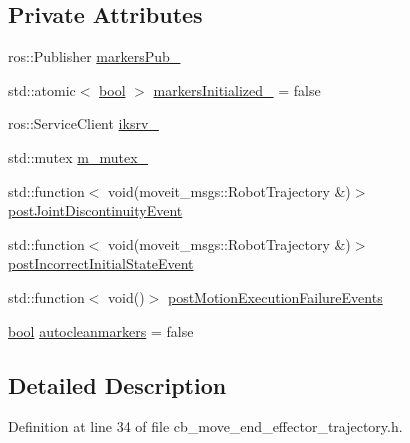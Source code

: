 \subsection*{Private Attributes}
\begin{DoxyCompactItemize}
\item 
ros\+::\+Publisher \hyperlink{classcl__move__group__interface_1_1CbMoveEndEffectorTrajectory_aabc2216b2d8625fecd83c5ec69928e63}{markers\+Pub\+\_\+}
\item 
std\+::atomic$<$ \hyperlink{classbool}{bool} $>$ \hyperlink{classcl__move__group__interface_1_1CbMoveEndEffectorTrajectory_ac140a7f0adfb20f1e2900a5c8cd2ca5b}{markers\+Initialized\+\_\+} = false
\item 
ros\+::\+Service\+Client \hyperlink{classcl__move__group__interface_1_1CbMoveEndEffectorTrajectory_a8a2e2225a5b53325241e45e4e28fa3a7}{iksrv\+\_\+}
\item 
std\+::mutex \hyperlink{classcl__move__group__interface_1_1CbMoveEndEffectorTrajectory_a2a98ef725cb3fc7f61654d3d6a2066bb}{m\+\_\+mutex\+\_\+}
\item 
std\+::function$<$ void(moveit\+\_\+msgs\+::\+Robot\+Trajectory \&)$>$ \hyperlink{classcl__move__group__interface_1_1CbMoveEndEffectorTrajectory_a308331beab9b2ec0eae72fa56fa999c9}{post\+Joint\+Discontinuity\+Event}
\item 
std\+::function$<$ void(moveit\+\_\+msgs\+::\+Robot\+Trajectory \&)$>$ \hyperlink{classcl__move__group__interface_1_1CbMoveEndEffectorTrajectory_a6180230347c922fa0d85f514ce5029df}{post\+Incorrect\+Initial\+State\+Event}
\item 
std\+::function$<$ void()$>$ \hyperlink{classcl__move__group__interface_1_1CbMoveEndEffectorTrajectory_a72c4a469b70617dc5ea75e225a013582}{post\+Motion\+Execution\+Failure\+Events}
\item 
\hyperlink{classbool}{bool} \hyperlink{classcl__move__group__interface_1_1CbMoveEndEffectorTrajectory_a790c30b94509dc6f4d0064f6356a04db}{autocleanmarkers} = false
\end{DoxyCompactItemize}


\subsection{Detailed Description}


Definition at line 34 of file cb\+\_\+move\+\_\+end\+\_\+effector\+\_\+trajectory.\+h.



